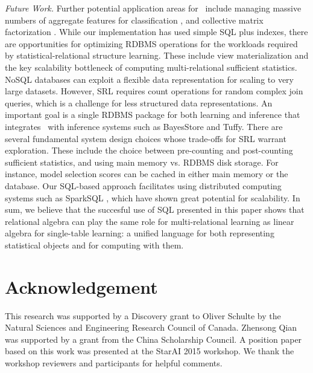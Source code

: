 \documentclass{IEEEtran}
\begin{document}
{\em Future Work.} Further potential application areas for \FB\ include managing massive numbers of aggregate features for classification \cite{Popescul2007}, and collective matrix factorization \cite{Singh2008,Singh2013}. 
While our implementation has used simple SQL plus indexes, there are opportunities for optimizing RDBMS operations for the workloads required by statistical-relational structure learning. These include view materialization and the key scalability bottleneck of computing multi-relational sufficient statistics. NoSQL databases can exploit a flexible data representation for scaling to very large datasets. However, SRL requires count operations for random complex join queries, which is a challenge for less structured data representations. An important goal is a single RDBMS package for both learning and inference that integrates \FB\ with inference systems such as BayesStore and Tuffy. 
%
There are several fundamental system design choices whose trade-offs for SRL warrant exploration. These include the choice between pre-counting and post-counting sufficient statistics, and using main memory vs. RDBMS disk storage. For instance, model selection scores can be cached in either main memory or the database. Our SQL-based approach facilitates using distributed computing systems such as SparkSQL \cite{Michael2015}, which have shown great potential for scalability. 
In sum, we believe that the succesful use of SQL presented in this paper shows that relational algebra can play the same role for multi-relational learning as linear algebra for single-table learning: a unified language for both representing statistical objects and for computing with them.


\section*{Acknowledgement} 
This research was supported by a Discovery grant to Oliver Schulte by the Natural Sciences and Engineering Research Council of Canada. 
Zhensong Qian was supported by a grant from the China Scholarship Council.
A position paper based on this work was presented at the StarAI 2015 workshop. We thank the workshop reviewers and participants for helpful comments.


 
\end{document}
